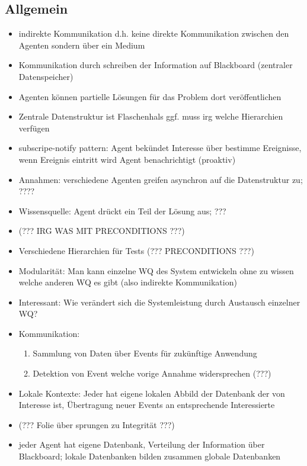 \documentclass{article} %
\begin{document}
	\subsection{Allgemein}
	\begin{itemize}
		\item indirekte Kommunikation d.h. keine direkte Kommunikation zwischen den Agenten sondern über ein Medium
		\item Kommunikation durch schreiben der Information auf Blackboard (zentraler Datenspeicher)
		\item Agenten können partielle Lösungen für das Problem dort veröffentlichen
		\item Zentrale Datenstruktur ist Flaschenhals ggf. muss irg welche Hierarchien verfügen
		\item subscripe-notify pattern: Agent bekündet Interesse über  bestimme Ereignisse, wenn Ereignis eintritt wird Agent benachrichtigt (proaktiv)
		\item Annahmen: verschiedene Agenten greifen asynchron auf die Datenstruktur zu; ????
		\item Wissensquelle: Agent drückt ein Teil der Lösung aus; ???
		\item (??? IRG WAS MIT PRECONDITIONS ???)
		\item Verschiedene Hierarchien für Tests (??? PRECONDITIONS ???)
		\item Modularität: Man kann einzelne WQ des System entwickeln ohne zu wissen welche anderen WQ es gibt (also indirekte Kommunikation)
		\item Interessant: Wie verändert sich die Systemleistung durch Austausch einzelner WQ?
		\item Kommunikation:
		\begin{enumerate}
			\item Sammlung von Daten über Events für zukünftige Anwendung
			\item Detektion von Event welche vorige Annahme widersprechen (???)
		\end{enumerate}
		\item Lokale Kontexte: Jeder hat eigene lokalen Abbild der Datenbank der von Interesse ist, Übertragung neuer Events an entsprechende Interessierte
		\item (??? Folie über sprungen zu Integrität ???)
		\item jeder Agent hat eigene Datenbank, Verteilung der Information über Blackboard; lokale Datenbanken bilden zusammen globale Datenbanken
	\end{itemize}
\end{document}
